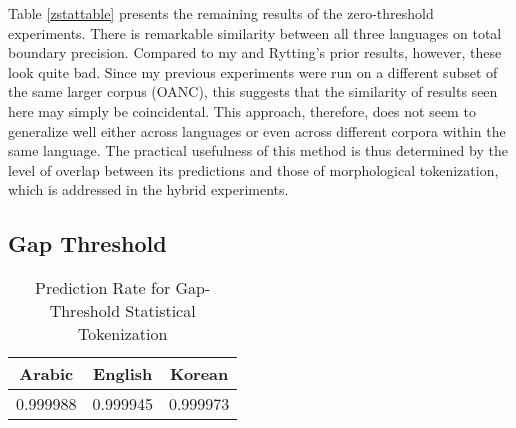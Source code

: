 Table \ref{zstattable} presents the remaining results of the zero-threshold experiments. There is remarkable similarity between all three languages on total boundary precision. Compared to my \cite{kearsley14} and Rytting's \cite{rytting04} prior results, however, these look quite bad. Since my previous experiments were run on a different subset of the same larger corpus (OANC), this suggests that the similarity of results seen here may simply be coincidental. This approach, therefore, does not seem to generalize well either across languages or even across different corpora within the same language. The practical usefulness of this method is thus determined by the level of overlap between its predictions and those of morphological tokenization, which is addressed in the hybrid experiments.

\FloatBarrier

\subsection{Gap Threshold}
\FloatBarrier

\begin{table}
	\centering
	\begin{tabular}{| c | c | c |}
		\hline
		Arabic & English & Korean \\ \hline
		0.999988 & 0.999945 & 0.999973 \\ \hline
	\end{tabular}
	\caption{Prediction Rate for Gap-Threshold Statistical Tokenization}
	\label{gpredtable}
\end{table}

